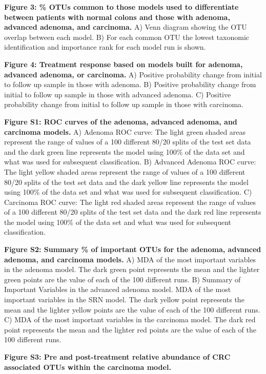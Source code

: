 \documentclass[12pt,]{article}
\providecommand{\DIFaddtex}[1]{{\protect\color{blue}\uwave{#1}}} %
\providecommand{\DIFaddbegin}{} %
\providecommand{\DIFaddend}{} %
\providecommand{\DIFadd}[1]{\texorpdfstring{\DIFaddtex{#1}}{#1}} %
\begin{document}
\textbf{Figure 3: \DIFaddbegin \DIFadd{Top 10}\% \DIFadd{most important }\DIFaddend OTUs common to those models
used to differentiate between patients with normal colons and those with
adenoma, advanced adenoma, and carcinoma.} A) Venn diagram showing the
OTU overlap between each model. B) For each common OTU the lowest
taxonomic identification and importance rank for each model run is
shown.

\textbf{Figure 4: Treatment response based on models built for adenoma,
advanced adenoma, or carcinoma.} A) Positive probability change from
initial to follow up sample in those with adenoma. B) Positive
probability change from initial to follow up sample in those with
advanced adenoma. C) Positive probability change from initial to follow
up sample in those with carcinoma.

\newpage

\textbf{Figure S1: ROC curves of the adenoma, advanced adenoma, and
carcinoma models.} A) Adenoma ROC curve: The light green shaded areas
represent the range of values of a 100 different 80/20 splits of the
test set data and the dark green line represents the model using 100\%
of the data set and what was used for subsequent classification. B)
Advanced Adenoma ROC curve: The light yellow shaded areas represent the
range of values of a 100 different 80/20 splits of the test set data and
the dark yellow line represents the model using 100\% of the data set
and what was used for subsequent classification. C) Carcinoma ROC curve:
The light red shaded areas represent the range of values of a 100
different 80/20 splits of the test set data and the dark red line
represents the model using 100\% of the data set and what was used for
subsequent classification.

\textbf{Figure S2: Summary \DIFaddbegin \DIFadd{of top 10}\% \DIFaddend of important OTUs for the
adenoma, advanced adenoma, and carcinoma models.} A) MDA of the most
important variables in the adenoma model. The dark green point
represents the mean and the lighter green points are the value of each
of the 100 different runs. B) Summary of Important Variables in the
advanced adenoma model. MDA of the most important variables in the SRN
model. The dark yellow point represents the mean and the lighter yellow
points are the value of each of the 100 different runs. C) MDA of the
most important variables in the carcinoma model. The dark red point
represents the mean and the lighter red points are the value of each of
the 100 different runs.

\textbf{Figure S3: Pre and post-treatment relative abundance of CRC
associated OTUs within the carcinoma model.}

\newpage
\end{document}
